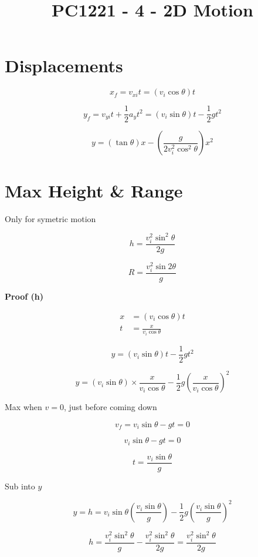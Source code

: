 \documentclass[12pt]{article}
\title{\textbf{PC1221 - 4 - 2D Motion}}
\date{}
\begin{document}
\maketitle

\begin{spacing}{1.5}

\section{Displacements}

\begin{center}
\end{center}

$$x_f = v_{xi} t = (v_i \cos{\theta})t$$

$$y_f = v_{yi} t + \frac{1}{2} a_y t^2 = (v_i \sin{\theta}) t - \frac{1}{2} gt^2$$

$$y = (\tan{\theta})x - (\frac{g}{2v_i^2 \cos^2{\theta}})x^2$$

\section{Max Height \& Range}

Only for symetric motion

$$h = \frac{v_i^2 \sin^2{\theta}}{2g}$$

$$R = \frac{v_i^2 \sin{2\theta}}{g}$$

\textbf{Proof (h)}

$$\begin{aligned}
x &= (v_i \cos{\theta})t \\
t &= \frac{x}{v_i \cos{\theta}}
\end{aligned}$$

$$y = (v_i \sin{\theta})t - \frac{1}{2} gt^2$$

$$y = (v_i \sin{\theta}) \times \frac{x}{v_i \cos{\theta}} - \frac{1}{2} g (\frac{x}{v_i \cos{\theta}})^2 $$

Max when $v = 0$, just before coming down

$$v_f = v_i \sin{\theta} - gt = 0$$

$$v_i \sin{\theta} - gt = 0$$

$$t = \frac{v_i \sin{\theta}}{g}$$

Sub into $y$

$$y = h = v_i \sin{\theta} (\frac{v_i\sin{\theta}}{g}) - \frac{1}{2} g (\frac{v_i \sin{\theta}}{g})^2$$

$$h = \frac{v_i^2 \sin^2{\theta}}{g} - \frac{v_i^2 \sin^2{\theta}}{2g} = \frac{v_i^2 \sin^2{\theta}}{2g}$$


\end{spacing}
\end{document}
